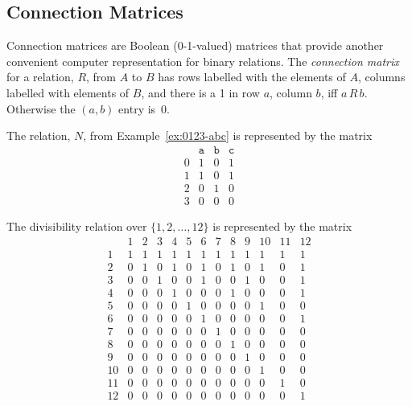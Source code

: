 \subsection{Connection Matrices}

Connection matrices are Boolean (0-1-valued) matrices that provide another
convenient computer representation for binary relations.  The
\emph{connection matrix} for a relation, $R$, from $A$ to $B$ has rows
labelled with the elements of $A$, columns labelled with elements of $B$,
and there is a 1 in row $a$, column $b$, iff $a\, R\, b$.  Otherwise the
$(a,b)$ entry is~0.
\begin{example}
The relation, $N$, from Example~\ref{ex:0123-abc} is represented by the
matrix
\[
\begin{array} {r|ccc}
& \texttt{a}& \texttt{b}&  \texttt{c} \\ 
\hline
0&1& 0&  1\\
1&1& 0&  1\\
2&0& 1&  0\\
3&0& 0&  0
\end{array}
\]
\end{example}

\begin{example}\label{divis12}
The divisibility relation over $\{1,2,\dots,12\}$ is 
represented by the matrix
\[
\begin{array}{r|cccccccccccc}
        &1  &2  &3  &4  &5  &6  &7  &8  &9 &10 &11 &12\\
      \hline
      1 &1  &1  &1  &1  &1  &1  &1  &1  &1  &1  &1  &1\\
      2 &0  &1  &0  &1  &0  &1  &0  &1  &0  &1  &0  &1\\
      3 &0  &0  &1  &0  &0  &1  &0  &0  &1  &0  &0  &1\\
      4 &0  &0  &0  &1  &0  &0  &0  &1  &0  &0  &0  &1\\
      5 &0  &0  &0  &0  &1  &0  &0  &0  &0  &1  &0  &0\\
      6 &0  &0  &0  &0  &0  &1  &0  &0  &0  &0  &0  &1\\
      7 &0  &0  &0  &0  &0  &0  &1  &0  &0  &0  &0  &0\\
      8 &0  &0  &0  &0  &0  &0  &0  &1  &0  &0  &0  &0\\
      9 &0  &0  &0  &0  &0  &0  &0  &0  &1  &0  &0  &0\\
      10&0  &0  &0  &0  &0  &0  &0  &0  &0  &1  &0  &0\\
      11&0  &0  &0  &0  &0  &0  &0  &0  &0  &0  &1  &0\\
      12&0  &0  &0  &0  &0  &0  &0  &0  &0  &0  &0  &1\\
    \end{array}
\]
\end{example}

